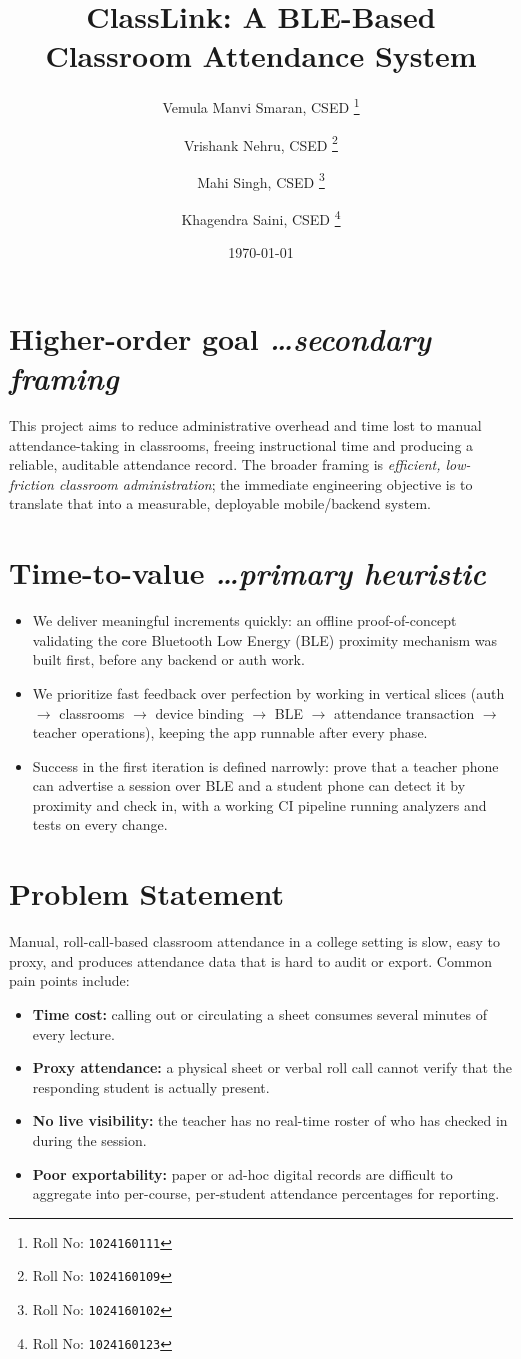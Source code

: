 \documentclass[11pt,a4paper]{article}
\title{ClassLink: A BLE-Based Classroom Attendance System}
\author{
  Vemula Manvi Smaran, CSED%
  \thanks{Roll No: \texttt{1024160111}}
  \and
  Vrishank Nehru, CSED%
  \thanks{Roll No: \texttt{1024160109}}
  \and
  Mahi Singh, CSED%
  \thanks{Roll No: \texttt{1024160102}}
  \and
  Khagendra Saini, CSED%
  \thanks{Roll No: \texttt{1024160123}}
}
\date{\today}
\newcommand{\BvrHint}[1]{%
  {\normalfont\normalsize\itshape\hfill #1}}
\begin{document}
\maketitle

\section{Higher-order goal%
  \BvrHint{\ldots secondary framing}}
This project aims to reduce administrative overhead and time lost to
manual attendance-taking in classrooms, freeing instructional time and
producing a reliable, auditable attendance record. The broader framing is
\emph{efficient, low-friction classroom administration}; the immediate
engineering objective is to translate that into a measurable, deployable
mobile/backend system.

\section{Time-to-value %
\BvrHint{\ldots primary heuristic}}
\begin{itemize}[leftmargin=0.7cm]
    \item We deliver meaningful increments quickly: an offline
    proof-of-concept validating the core Bluetooth Low Energy (BLE)
    proximity mechanism was built first, before any backend or auth work.
    \item We prioritize fast feedback over perfection by working in
    vertical slices (auth $\rightarrow$ classrooms $\rightarrow$ device
    binding $\rightarrow$ BLE $\rightarrow$ attendance transaction
    $\rightarrow$ teacher operations), keeping the app runnable after every
    phase.
    \item Success in the first iteration is defined narrowly: prove that a
    teacher phone can advertise a session over BLE and a student phone can
    detect it by proximity and check in, with a working CI pipeline
    running analyzers and tests on every change.
\end{itemize}

\section{Problem Statement}
Manual, roll-call-based classroom attendance in a college setting is slow,
easy to proxy, and produces attendance data that is hard to audit or
export. Common pain points include:
\begin{itemize}[leftmargin=0.7cm]
    \item \textbf{Time cost:} calling out or circulating a sheet consumes
    several minutes of every lecture.
    \item \textbf{Proxy attendance:} a physical sheet or verbal roll call
    cannot verify that the responding student is actually present.
    \item \textbf{No live visibility:} the teacher has no real-time
    roster of who has checked in during the session.
    \item \textbf{Poor exportability:} paper or ad-hoc digital records are
    difficult to aggregate into per-course, per-student attendance
    percentages for reporting.
\end{itemize}
\end{document}
